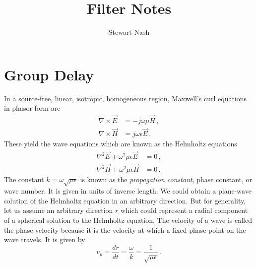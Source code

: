 \documentclass{article}
\begin{document}
	\title{Filter Notes}
	\author{Stewart Nash}

	\maketitle
	\section{Group Delay}
In a source-free, linear, isotropic, homogeneous region, Maxwell's curl equations in phasor form are
\begin{align}
	\nabla\times\vec{E}&=-j\omega\mu\vec{H}\,,\\
	\nabla\times\vec{H}&=j\omega\epsilon\vec{E}\,.
\end{align}
These yield the wave equations which are known as the Helmholtz equations
\begin{align}
	\nabla^2\vec{E}+\omega^2\mu\epsilon\vec{E}&=0\,,\\
	\nabla^2\vec{H}+\omega^2\mu\epsilon\vec{H}&=0\,.
\end{align}
The constant $k=\omega\sqrt{\mu\epsilon}$ is known as the \emph{propagation constant}, phase constant, or wave number. It is given in units of inverse length.
We could obtain a plane-wave solution of the Helmholtz equation in an arbitrary direction. But for generality, let us assume an arbitrary direction $r$ which could represent a radial component of a spherical solution to the Helmholtz equation. The velocity of a wave is called the phase velocity because it is the velocity at which a fixed phase point on the wave travels. It is given by
\begin{equation}
	v_p=\frac{dr}{dt}=\frac{\omega}{k}=\frac{1}{\sqrt{\mu\epsilon}}\,.
\end{equation}
\end{document}
